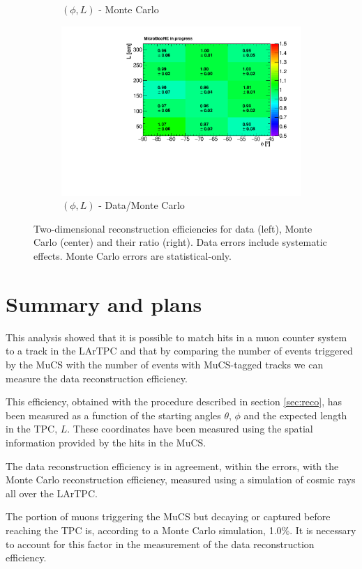 \documentclass[a4paper]{scrartcl}
\begin{document}
\begin{figure}[htbp]
\begin{subfigure}{0.33\textwidth}
\caption{$(\phi,L)$ - Monte Carlo}
\end{subfigure}\begin{subfigure}{0.33\textwidth}
\includegraphics[width=\linewidth]{figures/phi_l.pdf}
\caption{$(\phi,L)$ - Data/Monte Carlo}
\end{subfigure}
\caption{Two-dimensional reconstruction efficiencies for data (left), Monte Carlo (center) and their ratio (right). Data errors include systematic effects. Monte Carlo errors are statistical-only.}\label{fig:2d}
\end{figure}

\section{Summary and plans}
This analysis showed that it is possible to match hits in a muon counter system to a track in the LArTPC and that by comparing the number of events triggered by the MuCS with the number of events with MuCS-tagged tracks we can measure the data reconstruction efficiency.

This efficiency, obtained with the procedure described in section \ref{sec:reco}, has been measured as a function of the starting angles $\theta$, $\phi$ and the expected length in the TPC, $L$. These coordinates have been measured using the spatial information provided by the hits in the MuCS.

The data reconstruction efficiency is in agreement, within the errors, with the Monte Carlo reconstruction efficiency, measured using a simulation of cosmic rays all over the LArTPC.

The portion of muons triggering the MuCS but decaying or captured before reaching the TPC is, according to a Monte Carlo simulation, 1.0\%. It is necessary to account for this factor in the measurement of the data reconstruction efficiency.
\end{document}
